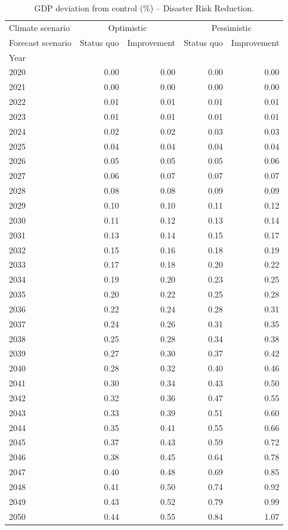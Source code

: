 \begin{table}
\caption{GDP deviation from control (\%) -- Disaster Risk Reduction.}
\label{tab:results_DRR_control_rel}
\centering
\begin{tabular}{lrrrr}
\toprule
Climate scenario & \multicolumn{2}{c}{Optimistic} & \multicolumn{2}{c}{Pessimistic} \\
Forecast scenario & Status quo & Improvement & Status quo & Improvement \\
Year &  &  &  &  \\
\midrule
2020 & 0.00 & 0.00 & 0.00 & 0.00 \\
2021 & 0.00 & 0.00 & 0.00 & 0.00 \\
2022 & 0.01 & 0.01 & 0.01 & 0.01 \\
2023 & 0.01 & 0.01 & 0.01 & 0.01 \\
2024 & 0.02 & 0.02 & 0.03 & 0.03 \\
2025 & 0.04 & 0.04 & 0.04 & 0.04 \\
2026 & 0.05 & 0.05 & 0.05 & 0.06 \\
2027 & 0.06 & 0.07 & 0.07 & 0.07 \\
2028 & 0.08 & 0.08 & 0.09 & 0.09 \\
2029 & 0.10 & 0.10 & 0.11 & 0.12 \\
2030 & 0.11 & 0.12 & 0.13 & 0.14 \\
2031 & 0.13 & 0.14 & 0.15 & 0.17 \\
2032 & 0.15 & 0.16 & 0.18 & 0.19 \\
2033 & 0.17 & 0.18 & 0.20 & 0.22 \\
2034 & 0.19 & 0.20 & 0.23 & 0.25 \\
2035 & 0.20 & 0.22 & 0.25 & 0.28 \\
2036 & 0.22 & 0.24 & 0.28 & 0.31 \\
2037 & 0.24 & 0.26 & 0.31 & 0.35 \\
2038 & 0.25 & 0.28 & 0.34 & 0.38 \\
2039 & 0.27 & 0.30 & 0.37 & 0.42 \\
2040 & 0.28 & 0.32 & 0.40 & 0.46 \\
2041 & 0.30 & 0.34 & 0.43 & 0.50 \\
2042 & 0.32 & 0.36 & 0.47 & 0.55 \\
2043 & 0.33 & 0.39 & 0.51 & 0.60 \\
2044 & 0.35 & 0.41 & 0.55 & 0.66 \\
2045 & 0.37 & 0.43 & 0.59 & 0.72 \\
2046 & 0.38 & 0.45 & 0.64 & 0.78 \\
2047 & 0.40 & 0.48 & 0.69 & 0.85 \\
2048 & 0.41 & 0.50 & 0.74 & 0.92 \\
2049 & 0.43 & 0.52 & 0.79 & 0.99 \\
2050 & 0.44 & 0.55 & 0.84 & 1.07 \\
\bottomrule
\end{tabular}
\end{table}
